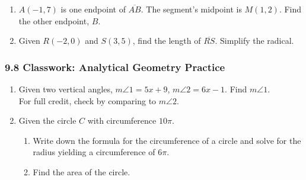 \documentclass[12pt, twoside]{article}
\begin{document}
\begin{enumerate}
   \item $A(-1,7)$ is one endpoint of $\overline{AB}$. The segment's midpoint is $M(1,2)$. Find the other endpoint, $B$. \vspace{3cm}

     \item Given $R(-2,0)$ and $S(3,5)$, find the length of $\overline{RS}$. Simplify the radical.

 \end{enumerate}
 \newpage
 \setcounter{page}{1}
\subsubsection*{9.8 Classwork: Analytical Geometry Practice}
\begin{enumerate}


   \item Given two vertical angles, $m \angle 1 = 5x+9$, $m \angle 2 = 6x-1$. Find $m \angle 1$.\\
   For full credit, check by comparing to $m\angle 2$.
       \begin{flushright}
       \end{flushright}

   \item Given the circle $C$ with circumference $10\pi$.
   \begin{enumerate}
     \item Write down the formula for the circumference of a circle and solve for the radius yielding a circumference of $6\pi$. \vspace{1cm}
     \item Find the area of the circle.
   \end{enumerate}




\end{enumerate}
\end{document}
